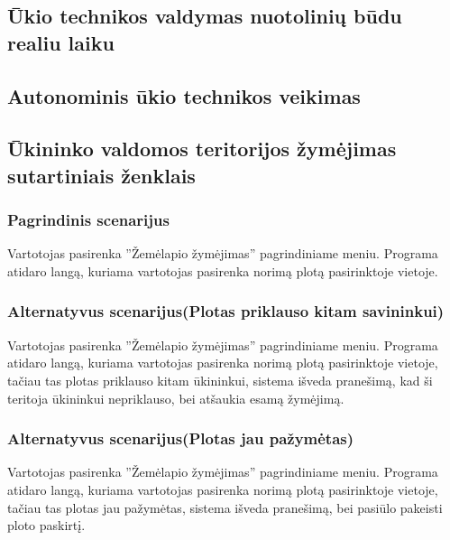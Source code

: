 \documentclass[oneside]{VUMIFPSkursinis}
\begin{document}
\subsection{Ūkio technikos valdymas nuotolinių būdu realiu laiku}
\subsection{Autonominis ūkio technikos veikimas}
\subsection{Ūkininko valdomos teritorijos žymėjimas sutartiniais ženklais}
	\subsubsection{Pagrindinis scenarijus}
	Vartotojas pasirenka ''Žemėlapio žymėjimas'' pagrindiniame meniu. Programa atidaro langą, kuriama vartotojas pasirenka norimą plotą pasirinktoje vietoje.
	\subsubsection{Alternatyvus scenarijus(Plotas priklauso kitam savininkui)}
	Vartotojas pasirenka ''Žemėlapio žymėjimas'' pagrindiniame meniu. Programa atidaro langą, kuriama vartotojas pasirenka norimą plotą pasirinktoje vietoje, tačiau tas plotas priklauso kitam ūkininkui, sistema išveda pranešimą, kad ši teritoja ūkininkui nepriklauso, bei atšaukia esamą žymėjimą.
	\subsubsection{Alternatyvus scenarijus(Plotas jau pažymėtas)}
	Vartotojas pasirenka ''Žemėlapio žymėjimas'' pagrindiniame meniu. Programa atidaro langą, kuriama vartotojas pasirenka norimą plotą pasirinktoje vietoje, tačiau tas plotas jau pažymėtas, sistema išveda pranešimą, bei pasiūlo pakeisti ploto paskirtį.
\end{document}
